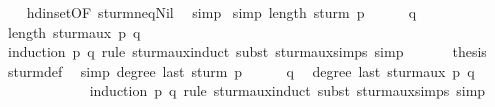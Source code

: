 \begin{isabellebody}
%
\isadelimproof
\ \ %
\endisadelimproof
%
\isatagproof
{}\isamarkupfalse%
\ hd{\isacharunderscore}in{\isacharunderscore}set{\isacharbrackleft}OF\ sturm{\isacharunderscore}neq{\isacharunderscore}Nil{\isacharbrackright}\ \isamarkupfalse%
\ simp%
\endisatagproof
{\isafoldproof}%
%
\isadelimproof
\isanewline
%
\endisadelimproof
\isanewline
{}\isamarkupfalse%
\ {\isacharbrackleft}simp{\isacharbrackright}{\isacharcolon}\ {\isachardoublequoteopen}length\ {\isacharparenleft}sturm\ p{\isacharparenright}\ {\isasymge}\ {}{\isachardoublequoteclose}\isanewline
%
\isadelimproof
%
\endisadelimproof
%
\isatagproof
{}\isamarkupfalse%
{\isacharminus}\isanewline
\ \ \isacommand{{\isacharbraceleft}}\isamarkupfalse%
\isamarkupfalse%
\ q\ \isamarkupfalse%
\ {\isachardoublequoteopen}length\ {\isacharparenleft}sturm{\isacharunderscore}aux\ p\ q{\isacharparenright}\ {\isasymge}\ {}{\isachardoublequoteclose}\isanewline
\ \ \ \ \ \ \ \ \ \ \ \isamarkupfalse%
\ {\isacharparenleft}induction\ p\ q\ rule{\isacharcolon}\ sturm{\isacharunderscore}aux{\isachardot}induct{\isacharcomma}\ subst\ sturm{\isacharunderscore}aux{\isachardot}simps{\isacharcomma}\ simp{\isacharparenright}\isanewline
\ \ \isacommand{{\isacharbraceright}}\isamarkupfalse%
\isanewline
\ \ \isamarkupfalse%
\ {\isacharquery}thesis\ \isamarkupfalse%
\ sturm{\isacharunderscore}def\ \isacommand{{\isachardot}}\isamarkupfalse%
\isanewline
{}\isamarkupfalse%
%
\endisatagproof
{\isafoldproof}%
%
\isadelimproof
\isanewline
%
\endisadelimproof
\isanewline
{}\isamarkupfalse%
\ {\isacharbrackleft}simp{\isacharbrackright}{\isacharcolon}\ {\isachardoublequoteopen}degree\ {\isacharparenleft}last\ {\isacharparenleft}sturm\ p{\isacharparenright}{\isacharparenright}\ {\isacharequal}\ {}{\isachardoublequoteclose}\isanewline
%
\isadelimproof
%
\endisadelimproof
%
\isatagproof
{}\isamarkupfalse%
{\isacharminus}\isanewline
\ \ \isacommand{{\isacharbraceleft}}\isamarkupfalse%
\isamarkupfalse%
\ q\ \isamarkupfalse%
\ {\isachardoublequoteopen}degree\ {\isacharparenleft}last\ {\isacharparenleft}sturm{\isacharunderscore}aux\ p\ q{\isacharparenright}{\isacharparenright}\ {\isacharequal}\ {}{\isachardoublequoteclose}\isanewline
\ \ \ \ \ \ \ \ \ \ \ \isamarkupfalse%
\ {\isacharparenleft}induction\ p\ q\ rule{\isacharcolon}\ sturm{\isacharunderscore}aux{\isachardot}induct{\isacharcomma}\ subst\ sturm{\isacharunderscore}aux{\isachardot}simps{\isacharcomma}\ simp{\isacharparenright}\isanewline

\end{isabellebody}
